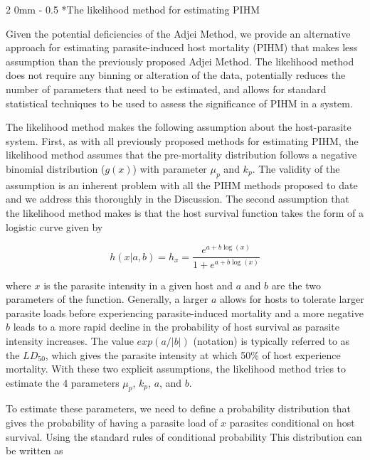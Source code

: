 \documentclass[12pt, a4paper]{article}
\makeatletter
\renewcommand{\subsection}{\@startsection
{subsection}%
{2}%
{0mm}%
{-\baselineskip}%
{0.5\baselineskip}%
{\normalfont\bf}} %
\makeatother
\begin{document}
\subsection*{The likelihood method for estimating PIHM}

Given the potential deficiencies of the Adjei Method, we provide an alternative
approach for estimating parasite-induced host mortality (PIHM) that makes less
assumption than the previously proposed Adjei Method.  The likelihood method
does not require any binning or alteration of the data, potentially reduces the
number of parameters that need to be estimated, and allows for standard
statistical techniques to be used to assess the significance of PIHM in a
system.

The likelihood method makes the following assumption about the host-parasite
system. First, as with all previously proposed methods for estimating PIHM, the
likelihood method assumes that the pre-mortality distribution follows a
negative binomial distribution ($g(x)$) with parameter $\mu_p$ and $k_p$. The
validity of the assumption is an inherent problem with all the PIHM methods
proposed to date and we address this thoroughly in the Discussion. The second
assumption that the likelihood method makes is that the host survival function
takes the form of a logistic curve given by

\begin{equation}
    h(x | a, b) = h_x = \dfrac{e^{a + b \log(x)}}{1 + e^{a + b \log(x)}}
    \label{eq:logistic}
\end{equation}

where $x$ is the parasite intensity in a given host and $a$ and $b$ are the two parameters of the function. Generally, a larger $a$ allows for hosts to tolerate larger parasite loads before experiencing parasite-induced mortality and a more negative $b$ leads to a more rapid decline in the probability of host survival as parasite intensity increases.  The value $exp(a / |b|)$ (notation) is typically referred to as the $LD_50$, which gives the parasite intensity at which 50\% of host experience mortality.  With these two explicit assumptions, the likelihood method tries to estimate the 4 parameters $\mu_p$, $k_p$, $a$, and $b$.

To estimate these parameters, we need to define a probability distribution that gives the probability of having a parasite load of $x$ parasites conditional on host survival.  Using the standard rules of conditional probability  This distribution can be written as
\end{document}
